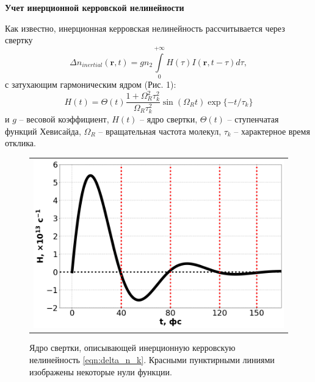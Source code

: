\documentclass[a4paper]{article}
\begin{document}
\begin{center}
\Large{\textbf{Учет инерционной керровской нелинейности}}
\end{center}

\noindent Как известно, инерционная керровская нелинейность рассчитывается через свертку 
\begin{equation}
\label{eqn:delta_n_k}
\Delta n_{inertial} (\mathbf{r}, t) = g n_2 \int\limits_{0}^{+\infty} H(\tau) I(\mathbf{r}, t - \tau) d\tau,
\end{equation}
с затухающим гармоническим ядром (Рис. 1):
\begin{equation}
\label{eqn:h_t}
H(t) = \Theta(t) \frac{1 + \Omega_R^2 \tau_k^2}{\Omega_R \tau_k^2} \sin(\Omega_R t) \exp \{ -t/\tau_k \}
\end{equation}
и $g$ -- весовой коэффициент, $H(t)$ -- ядро свертки, $\Theta(t)$ -- ступенчатая функций Хевисайда, $\Omega_R$ -- вращательная частота молекул, $\tau_k$ -- характерное время отклика. 

\begin{figure}[h]
\begin{center}
\begin{tabular}{M{10cm}}
\includegraphics[width=\linewidth]{images/convolution.png}
\end{tabular}
\begin{minipage}{0.7\textwidth}
\caption{Ядро свертки, описывающей инерционную керровскую нелинейность \eqref{eqn:delta_n_k}. Красными пунктирными линиями изображены некоторые нули функции.}
\end{minipage}
\label{pic:convolution_h}
\end{center}
\end{figure}
\end{document}
